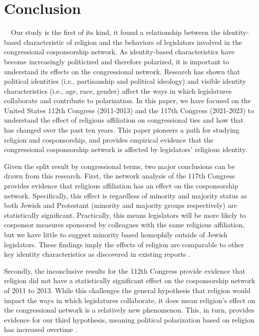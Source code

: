 \documentclass[Royal,times,sageh]{sagej}
\begin{document}
\hypertarget{conclusion}{%
\section{Conclusion}\label{conclusion}}

~~Our study is the first of its kind, it found a relationship between
the identity-based characteristic of religion and the behaviors of
legislators involved in the congressional cosponsorship network. As
identity-based characteristics have become increasingly politicized and
therefore polarized, it is important to understand its effects on the
congressional network. Research has shown that political identities
(i.e., partisanship and political ideology) and visible identity
characteristics (i.e., age, race, gender) affect the ways in which
legislatures collaborate and contribute to polarization. In this paper,
we have focused on the United States 112th Congress (2011-2013) and the
117th Congress (2021-2023) to understand the effect of religious
affiliation on congressional ties and how that has changed over the past
ten years. This paper pioneers a path for studying religion and
cosponsorship, and provides empirical evidence that the congressional
cosponsorship network is affected by legislators' religious identity.

Given the split result by congressional terms, two major conclusions can
be drawn from this research. First, the network analysis of the 117th
Congress provides evidence that religious affiliation has an effect on
the cosponsorship network. Specifically, this effect is regardless of
minority and majority status as both Jewish and Protestant (minority and
majority groups respectively) are statistically significant.
Practically, this means legislators will be more likely to cosponsor
measures sponsored by colleagues with the same religious affiliation,
but we have little to suggest minority based homophily outside of Jewish
legislators. These findings imply the effects of religion are comparable
to other key identity characteristics as discovered in existing reports
\citep{rocca} .

Secondly, the inconclusive results for the 112th Congress provide
evidence that religion did not have a statistically significant effect
on the cosponsorship network of 2011 to 2013. While this challenges the
general hypothesis that religion would impact the ways in which
legislatures collaborate, it does mean religion's effect on the
congressional network is a relatively new phenomenon. This, in turn,
provides evidence for our third hypothesis, meaning political
polarization based on religion has increased overtime .
\end{document}
